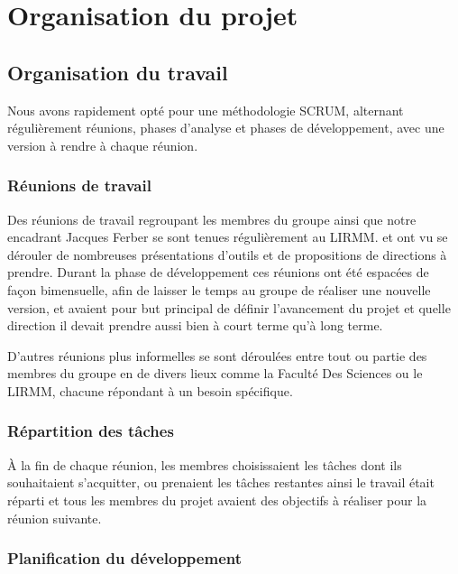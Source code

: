 \chapter{Organisation du projet}

\section{Organisation du travail}

Nous avons rapidement opté pour une méthodologie SCRUM, alternant régulièrement réunions, phases d'analyse et phases de développement, avec une version à rendre à chaque réunion.

\subsection{Réunions de travail}

Des réunions de travail regroupant les membres du groupe ainsi que notre encadrant Jacques Ferber se sont tenues régulièrement au LIRMM.
 et ont vu se dérouler de nombreuses présentations d'outils et de propositions de directions à prendre.
Durant la phase de développement ces réunions ont été espacées de façon bimensuelle, afin de laisser le temps au groupe de réaliser une nouvelle version, et avaient pour but principal de définir l'avancement du projet et quelle direction il devait prendre aussi bien à court terme qu'à long terme.

D'autres réunions plus informelles se sont déroulées entre tout ou partie des membres du groupe en de divers lieux comme la Faculté Des Sciences ou le LIRMM, chacune répondant à un besoin spécifique.

\subsection{Répartition des tâches}

À la fin de chaque réunion, les membres choisissaient les tâches dont ils souhaitaient s'acquitter, ou prenaient les tâches restantes ainsi le travail était réparti et tous les membres du projet avaient des objectifs à réaliser pour la réunion suivante.

\subsection{Planification du développement}

